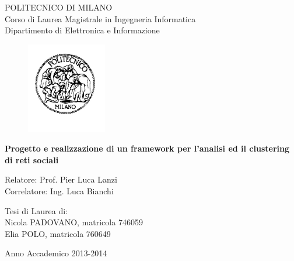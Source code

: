 \thispagestyle{empty}
\vspace*{-1.5cm} \bfseries{
\begin{center}
  \large
  POLITECNICO DI MILANO\\
  \normalsize
  Corso di Laurea Magistrale in Ingegneria Informatica\\
  Dipartimento di Elettronica e Informazione\\
  \begin{figure}[htbp]
    \begin{center}
      \includegraphics[width=3.5cm]{./pictures/logopm}
    \end{center}
  \end{figure}
  \vspace*{0.3cm} \LARGE



  \textbf{Progetto e realizzazione di un framework per l'analisi ed il clustering di reti sociali}\\



\end{center}
\vspace*{3.0cm} \large
\begin{flushleft}


  Relatore: Prof. Pier Luca Lanzi \\
  Correlatore: Ing. Luca Bianchi

\end{flushleft}
\vspace*{1.0cm}
\begin{flushright}


  Tesi di Laurea di:\\ Nicola PADOVANO, matricola 746059 \\ 
		       Elia POLO, matricola 760649\\


\end{flushright}
\vspace*{0.5cm}
\begin{center}

\vfill

  Anno Accademico 2013-2014
\end{center} \clearpage
}
